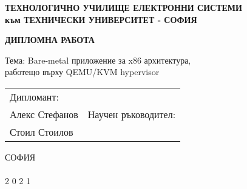 \thispagestyle{empty} %
\begin{center}
  \textbf{
    ТЕХНОЛОГИЧНО УЧИЛИЩЕ ЕЛЕКТРОННИ СИСТЕМИ \\
    към ТЕХНИЧЕСКИ УНИВЕРСИТЕТ - СОФИЯ \\
  }

  \vspace{70mm}
  \textbf{\huge ДИПЛОМНА РАБОТА \\ }

  \vspace{20mm}
  {\Large Тема:
    Bare-metal приложение за x86 архитектура, \\
    работещо върху QEMU/KVM hypervisor
  }

  \vspace{35mm}
  \begin{tabular}{p{8cm}p{8cm}}
    \centering
    Дипломант: \\
    Алекс Стефанов
    &
    \centering
    Научен ръководител: \\
    Стоил Стоилов
  \end{tabular}

  \vfill
  СОФИЯ \\
  \hfill \\
  2 0 2 1 \\
\end{center}
\newpage
